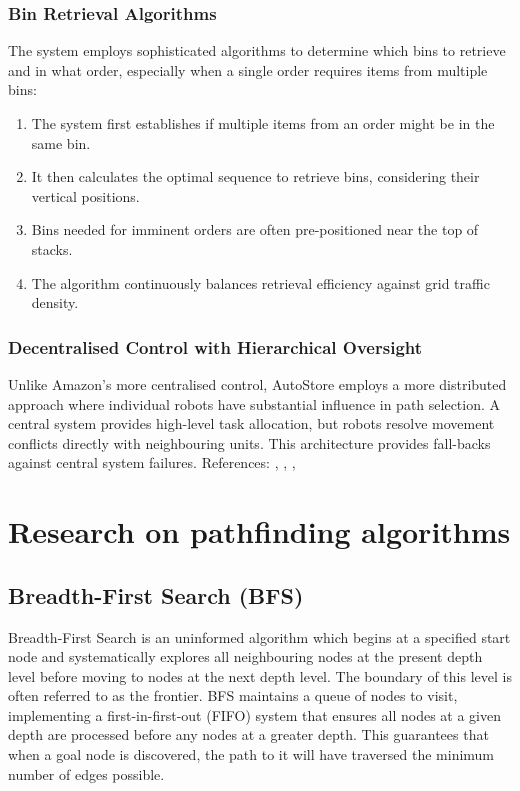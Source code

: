 \subsubsection{Bin Retrieval Algorithms}
The system employs sophisticated algorithms to determine which bins to retrieve and in what order, especially when a single order requires items from multiple bins:
\begin{enumerate}
    \item The system first establishes if multiple items from an order might be in the same bin.
    \item It then calculates the optimal sequence to retrieve bins, considering their vertical positions.
    \item Bins needed for imminent orders are often pre-positioned near the top of stacks.
    \item The algorithm continuously balances retrieval efficiency against grid traffic density.
\end{enumerate}

\subsubsection{Decentralised Control with Hierarchical Oversight}
Unlike Amazon's more centralised control, AutoStore employs a more distributed approach where individual robots have substantial influence in path selection. A central system provides high-level task allocation, but robots resolve movement conflicts directly with neighbouring units. This architecture provides fall-backs against central system failures. \newline References: \cite{autostore_2023_autostore}, \cite{solutions_2025_autostore}, \cite{systems_2018_autostore}, \cite{systems_autostore}

\newpage

\section{Research on pathfinding algorithms}

\subsection{Breadth-First Search (BFS) \cite{point_data}}
Breadth-First Search is an uninformed algorithm which begins at a specified start node and systematically explores all neighbouring nodes at the present depth level before moving to nodes at the next depth level. The boundary of this level is often referred to as the frontier. BFS maintains a queue of nodes to visit, implementing a first-in-first-out (FIFO) system that ensures all nodes at a given depth are processed before any nodes at a greater depth. This guarantees that when a goal node is discovered, the path to it will have traversed the minimum number of edges possible.
